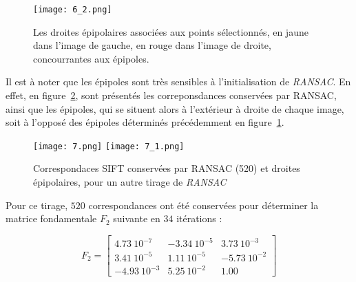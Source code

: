 \documentclass[12pt,a4paper,onecolumn]{article}
\begin{document}
\begin{figure}[H]
	\centering
	\texttt{[image: 6\_2.png]}
	\caption{Les droites épipolaires associées aux points sélectionnés, en jaune dans l'image de gauche, en rouge dans l'image de droite, concourrantes aux épipoles.}
	\label{fig:epipolar_lines}
\end{figure}

Il est à noter que les épipoles sont très sensibles à l'initialisation de \textit{RANSAC}. En effet, en figure~\ref{fig:sensitive}, sont présentés les correponsdances conservées par RANSAC, ainsi que les épipoles, qui se situent alors à l'extérieur à droite de chaque image, soit à l'opposé des épipoles déterminés précédemment en figure~\ref{fig:epipolar_lines}.

\begin{figure}[H]
	\centering
	\texttt{[image: 7.png]}
	\texttt{[image: 7\_1.png]}
	\caption{Correspondaces SIFT conservées par RANSAC (520) et droites épipolaires, pour un autre tirage de \textit{RANSAC}}
	\label{fig:sensitive}
\end{figure}

Pour ce tirage, \( 520 \) correspondances ont été conservées pour déterminer la matrice fondamentale \( F_2 \) suivante en \( 34 \) itérations :

\[
	F_2=
	\begin{bmatrix}
		4.73~10^{-7}  & -3.34~10^{-5} & 3.73~10^{-3}  \\
		3.41~10^{-5}  & 1.11~10^{-5}  & -5.73~10^{-2} \\
		-4.93~10^{-3} & 5.25~10^{-2}  & 1.00
	\end{bmatrix}
\]
\end{document}

